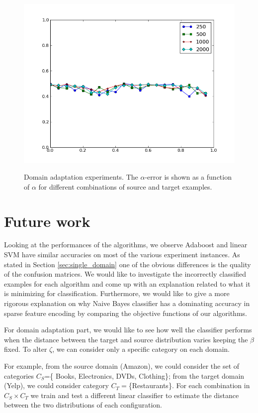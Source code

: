 \documentclass[letterpaper]{article}
\begin{document}
\begin{figure}
  \subfigure%
  {\includegraphics[scale=.3]{adaptation_err_T}}
  \caption{Domain adaptation experiments. The $\alpha$-error is shown as a function of $\alpha$ for different combinations of source and target examples.}
  \label{fig:domain-adaptation}
\end{figure}

\section{Future work}
\label{sec:future-work}

Looking at the performances of the algorithms, we observe Adaboost and
linear SVM have similar accuracies on most of the various experiment
instances. As stated in Section \ref{sec:single_domain} one of the
obvious differences is the quality of the confusion matrices. We would
like to investigate the incorrectly classified examples for each
algorithm and come up with an explanation related to what it is
minimizing for classification.  Furthermore, we would like to give a
more rigorous explanation on why Naive Bayes classifier has a
dominating accuracy in sparse feature encoding by comparing the
objective functions of our algorithms.

For domain adaptation part, we would like to see how well the
classifier performs when the distance between the target and source
distribution varies keeping the $\beta$ fixed. To alter $\zeta$, we
can consider only a specific category on each domain.

For example, from the source domain (Amazon), we could consider the
set of categories $C_S$=\{ Books, Electronics, DVDs, Clothing\};
from the target domain (Yelp), we could consider category
$C_T=$\{Restaurants\}. For each combination in $C_S\times C_T$ we
train and test a different linear classifier to estimate the distance
between the two distributions of each configuration.
\end{document}
